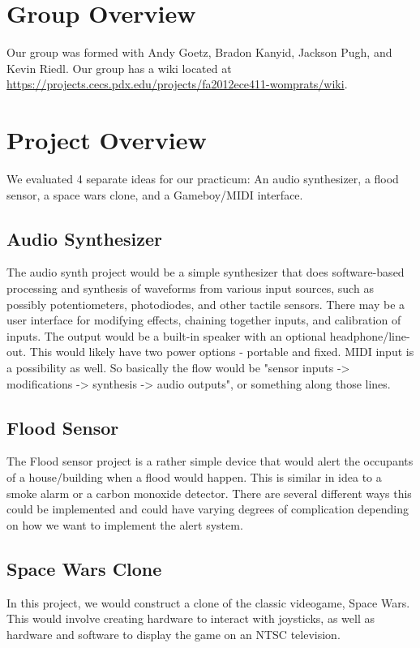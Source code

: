 \documentclass{article}
\begin{document}
\newenvironment{frcseries}{\fontfamily{frc}\selectfont}{}
\newcommand{\textfrc}[1]{{\frcseries#1}}
\newcommand{\mathfrc}[1]{\text{\textfrc{#1}}}


\section{Group Overview}
Our group was formed with Andy Goetz, Bradon Kanyid, Jackson Pugh, and
Kevin Riedl. Our group has a wiki located at
\url{https://projects.cecs.pdx.edu/projects/fa2012ece411-womprats/wiki}.
\section{Project Overview}

We evaluated 4 separate ideas for our practicum: An audio synthesizer,
a flood sensor, a space wars clone, and a Gameboy/MIDI interface.

\subsection{Audio Synthesizer}
The audio synth project would be a simple synthesizer that does
software-based processing and synthesis of waveforms from various
input sources, such as possibly potentiometers, photodiodes, and other
tactile sensors. There may be a user interface for modifying effects,
chaining together inputs, and calibration of inputs. The output would
be a built-in speaker with an optional headphone/line-out. This would
likely have two power options - portable and fixed. MIDI input is a
possibility as well. So basically the flow would be "sensor inputs ->
modifications -> synthesis -> audio outputs", or something along those
lines.
\subsection{Flood Sensor}
The Flood sensor project is a rather simple device that would alert
the occupants of a house/building when a flood would happen. This is
similar in idea to a smoke alarm or a carbon monoxide detector. There
are several different ways this could be implemented and could have
varying degrees of complication depending on how we want to implement
the alert system.
\subsection{Space Wars Clone}
In this project, we would construct a clone of the classic videogame,
Space Wars. This would involve creating hardware to interact with
joysticks, as well as hardware and software to display the game on an
NTSC television. 
\end{document}
